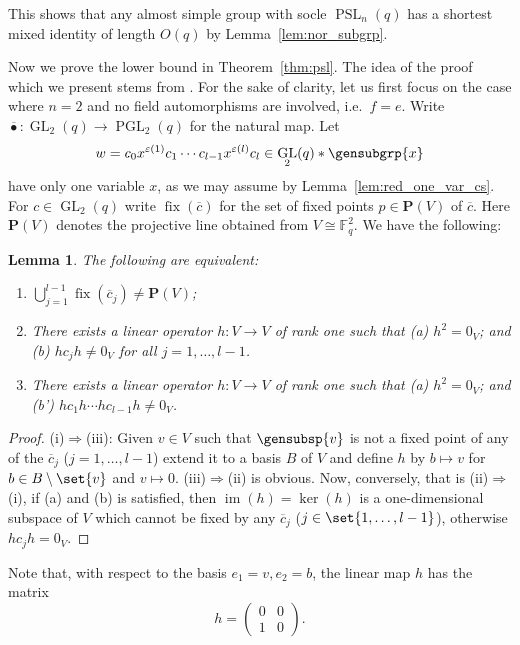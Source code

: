 \documentclass[a4paper,11pt]{amsproc}
\newcommand{\finfield}{\mathbb{F}}%
\DeclareMathOperator{\fix}{fix}%
\DeclareMathOperator{\GL}{GL}%
\DeclareMathOperator{\PSL}{PSL}%
\DeclareMathOperator{\PGL}{PGL}%
\DeclareMathOperator{\im}{im}%
\newcommand{\proj}{\mathbf P}%
\theoremstyle{plain}
\newtheorem{lemma}{Lemma}[section]
\theoremstyle{definition}
\begin{document}
	This shows that any almost simple group with socle $\PSL_n(q)$ has a shortest mixed identity of length $O(q)$ by Lemma~\ref{lem:nor_subgrp}.
	
	Now we prove the lower bound in Theorem~\ref{thm:psl}. The idea of the proof which we present stems from \cite{golubchikmikhalev1982generalized}. For the sake of clarity, let us first focus on the case where $n=2$ and no field automorphisms are involved, i.e.\ $f=e$. Write $\overline{\bullet}\colon\GL_2(q)\to\PGL_2(q)$ for the natural map. Let 
	$$
	w=c_0 x^{\varepsilon(1)} c_1 \cdots c_{l-1} x^{\varepsilon(l)} c_l\in\GL_2(q)\ast\gensubgrp{x}
	$$ 
	have only one variable $x$, as we may assume by Lemma~\ref{lem:red_one_var_cs}. For $c\in\GL_2(q)$ write $\fix(\overline{c})$ for the set of fixed points $p\in\proj(V)$ of $\overline{c}$. Here $\proj(V)$ denotes the projective line obtained from $V\cong\finfield_q^2$. We have the following:
	
	\begin{lemma}\label{lem:ex_good_rk_one_op}
		The following are equivalent:
		\begin{enumerate}[\normalfont(i)]
			\item $\bigcup_{j=1}^{l-1}{\fix(\overline{c}_j)}\neq\proj(V)$;
			\item There exists a linear operator $h\colon V\to V$ of rank one such that (a) $h^2=0_V$; and (b) $hc_jh\neq 0_V$ for all $j=1,\ldots,l-1$.
			\item There exists a linear operator $h\colon V\to V$ of rank one such that (a) $h^2=0_V$; and (b') $h c_1 h\cdots h c_{l-1} h\neq 0_V$.
		\end{enumerate}
	\end{lemma}
	
	\begin{proof}
		(i)$\Rightarrow$(iii): Given $v\in V$ such that $\gensubsp{v}$ is not a fixed point of any of the $\overline{c}_j$ ($j=1,\ldots,l-1$) extend it to a basis $B$ of $V$ and define $h$ by $b\mapsto v$ for $b\in B\setminus\set{v}$ and $v\mapsto 0$.
		(iii)$\Rightarrow$(ii) is obvious. Now,	conversely, that is (ii)$\Rightarrow$(i), if (a) and (b) is satisfied, then $\im(h)=\ker(h)$ is a one-dimensional subspace of $V$ which cannot be fixed by any $\overline{c}_j$ ($j\in\set{1,\ldots,l-1}$), otherwise $h c_j h=0_V$.
	\end{proof}
	
	Note that, with respect to the basis $e_1=v,e_2=b$, the linear map $h$ has the matrix
	$$
	h=
	\begin{pmatrix}
		0 & 0\\
		1 & 0
	\end{pmatrix}.
	$$
	
\end{document}
